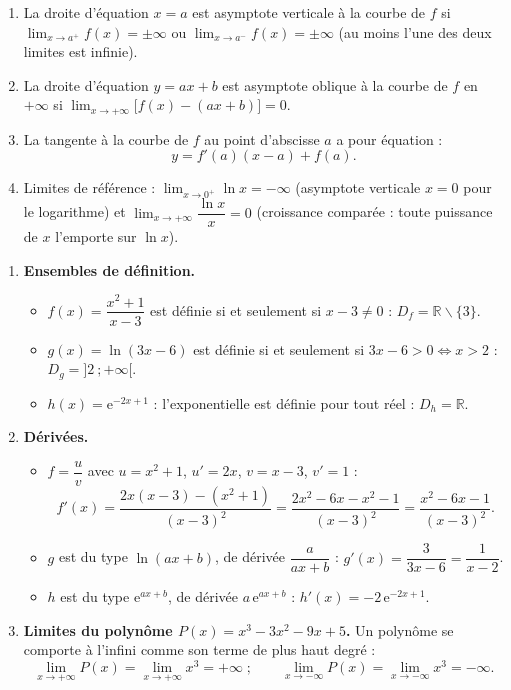 \documentclass[11pt]{article}
\newcommand{\cle}[1]{{\popxbold\color{popdark}#1}}
\def\setminus{\mathbin{\backslash}}\let\smallsetminus\setminus
\begin{document}
\begin{corrige}
\begin{enumerate}
\item La droite d'équation $x = a$ est \cle{asymptote verticale} à la courbe de $f$ si $\displaystyle\lim_{x \to a^+} f(x) = \pm\infty$ ou $\displaystyle\lim_{x \to a^-} f(x) = \pm\infty$ (au moins l'une des deux limites est infinie).
\item La droite d'équation $y = ax + b$ est \cle{asymptote oblique} à la courbe de $f$ en $+\infty$ si $\displaystyle\lim_{x \to +\infty} \big[f(x) - (ax + b)\big] = 0$.
\item La tangente à la courbe de $f$ au point d'abscisse $a$ a pour équation :
\[ y = f'(a)(x - a) + f(a). \]
\item Limites de référence : $\displaystyle\lim_{x \to 0^+} \ln x = -\infty$ (asymptote verticale $x = 0$ pour le logarithme) et $\displaystyle\lim_{x \to +\infty} \dfrac{\ln x}{x} = 0$ (croissance comparée : toute puissance de $x$ l'emporte sur $\ln x$).
\end{enumerate}
\end{corrige}

\begin{corrige}
\begin{enumerate}
\item \textbf{Ensembles de définition.}
\begin{itemize}
\item $f(x) = \dfrac{x^2+1}{x-3}$ est définie si et seulement si $x - 3 \neq 0$ : $D_f = \mathbb{R} \setminus \{3\}$.
\item $g(x) = \ln(3x - 6)$ est définie si et seulement si $3x - 6 > 0 \iff x > 2$ : $D_g = ]2\ ; +\infty[$.
\item $h(x) = \mathrm{e}^{-2x+1}$ : l'exponentielle est définie pour tout réel : $D_h = \mathbb{R}$.
\end{itemize}
\item \textbf{Dérivées.}
\begin{itemize}
\item $f = \dfrac{u}{v}$ avec $u = x^2 + 1$, $u' = 2x$, $v = x - 3$, $v' = 1$ :
\[ f'(x) = \dfrac{2x(x-3) - (x^2+1)}{(x-3)^2} = \dfrac{2x^2 - 6x - x^2 - 1}{(x-3)^2} = \dfrac{x^2 - 6x - 1}{(x-3)^2}. \]
\item $g$ est du type $\ln(ax+b)$, de dérivée $\dfrac{a}{ax+b}$ : $g'(x) = \dfrac{3}{3x - 6} = \dfrac{1}{x - 2}$.
\item $h$ est du type $\mathrm{e}^{ax+b}$, de dérivée $a\,\mathrm{e}^{ax+b}$ : $h'(x) = -2\,\mathrm{e}^{-2x+1}$.
\end{itemize}
\item \textbf{Limites du polynôme $P(x) = x^3 - 3x^2 - 9x + 5$.} Un polynôme se comporte à l'infini comme son terme de plus haut degré :
\[ \lim_{x \to +\infty} P(x) = \lim_{x \to +\infty} x^3 = +\infty \;; \qquad \lim_{x \to -\infty} P(x) = \lim_{x \to -\infty} x^3 = -\infty. \]
\end{enumerate}
\end{corrige}
\end{document}
